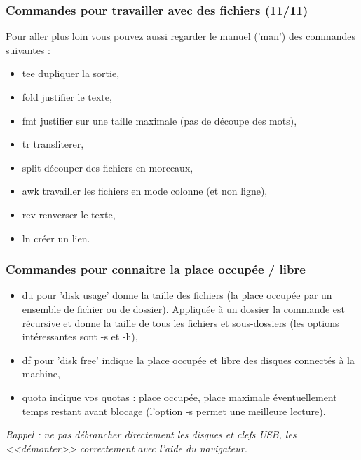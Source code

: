 \documentclass[handout,10pt]{beamer}
\begin{document}
\frame
{
    \frametitle{Commandes pour travailler avec des fichiers (11/11)}

    Pour aller plus loin vous pouvez aussi regarder le manuel ('man') des commandes suivantes :

    \begin{itemize}
        \item {\ttfamily tee} dupliquer la sortie,
        \item {\ttfamily fold} justifier le texte,
        \item {\ttfamily fmt} justifier sur une taille maximale (pas de découpe des mots),
        \item {\ttfamily tr} transliterer,
        \item {\ttfamily split} découper des fichiers en morceaux,
        \item {\ttfamily awk} travailler les fichiers en mode colonne (et non ligne),
        \item {\ttfamily rev} renverser le texte,
        \item {\ttfamily ln} créer un lien.
    \end{itemize}
}


\frame
{
    \frametitle{Commandes pour connaitre la place occupée / libre}

    \begin{itemize}
        \item {\ttfamily du} pour 'disk usage' donne la taille des fichiers (la place occupée par un ensemble de fichier ou de dossier). Appliquée à un dossier la commande est récursive et donne la taille de tous les fichiers et sous-dossiers (les options intéressantes sont -s et -h),
        \item {\ttfamily df} pour 'disk free' indique la place occupée et libre des disques connectés à la machine,
        \item {\ttfamily quota} indique vos quotas : place occupée, place maximale éventuellement temps restant avant blocage (l'option -s permet une meilleure lecture).
    \end{itemize}

    \textit{Rappel : ne pas débrancher directement les disques et clefs USB, les <<démonter>> correctement avec l'aide du navigateur.}
}
\end{document}
